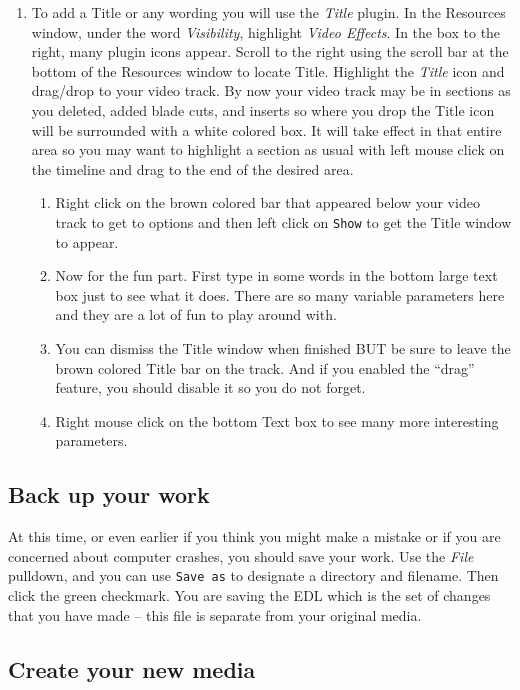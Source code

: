 \begin{enumerate}[resume]
	\item To add a Title or any wording you will use the \textit{Title} plugin.  In the Resources window, under the
	word \textit{Visibility}, highlight \textit{Video Effects}.  In the box to the right, many plugin icons appear.   Scroll
	to the right using the scroll bar at the bottom of the Resources window to locate Title.  Highlight the
	\textit{Title} icon and drag/drop to your video track.  By now your video track may be in sections as you
	deleted, added blade cuts, and inserts so where you drop the Title icon will be surrounded with a
	white colored box.  It will take effect in that entire area so you may want to highlight a section as
	usual with left mouse click on the timeline and drag to the end of the desired area.
	\begin{enumerate}
		\item Right click on the brown colored bar that appeared below your video track to get to options and
		then left click on \texttt{Show} to get the Title window to appear.
		\item Now for the fun part.  First type in some words in the bottom large text box just to see what it
		does.  There are so many variable parameters here and they are a lot of fun to play around with.
		\item You can dismiss the Title window when finished BUT be sure to leave the brown colored Title bar
		on the track.  And if you enabled the “drag” feature, you should disable it so you do not forget.
		\item Right mouse click on the bottom Text box to see many more interesting parameters.
	\end{enumerate}
\end{enumerate}

\subsection{Back up your work}%
\label{sub:backup_your_work}

At this time, or even earlier if you think you might make a mistake or if you are concerned about computer crashes, you should save your work.  Use the \textit{File} pulldown, and you can use \texttt{Save as} to designate a directory and filename.  Then click the green checkmark.  You are saving the EDL which is the set of changes that you have made -- this file is separate from your original media.

\subsection{Create your new media}%
\label{sub:create_new_media}

